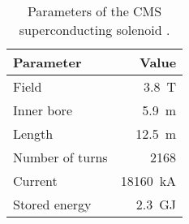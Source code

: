 \begin{table}[htbp]
\caption{Parameters of the CMS superconducting solenoid \autocite{CMS_TDR1, CMS_Solenoid}.}
\label{tab:solenoid_parameters}
\centering
\begin{tabular}{|lr|}
  \toprule
  Parameter & Value \\    
  \midrule
  Field & \SI{3.8}{\tesla} \\
  Inner bore & \SI{5.9}{\metre} \\
  Length & \SI{12.5}{\metre} \\
  Number of turns & \num{2168} \\
  Current & \SI{18160}{\kilo\ampere} \\
  Stored energy & \SI{2.3}{\giga\joule} \\
  \bottomrule
\end{tabular}
\end{table}
